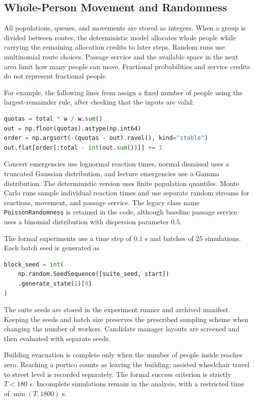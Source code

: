 \subsection{Whole-Person Movement and Randomness}

All populations, queues, and movements are stored as integers. When a group is divided between routes, the deterministic model allocates whole people while carrying the remaining allocation credits to later steps. Random runs use multinomial route choices. Passage service and the available space in the next area limit how many people can move. Fractional probabilities and service credits do not represent fractional people.

For example, the following lines from  assign a fixed number of people using the largest-remainder rule, after checking that the inputs are valid:
\begin{lstlisting}[language=Python,basicstyle=\ttfamily\small,breaklines=true,frame=single]
quotas = total * w / w.sum()
out = np.floor(quotas).astype(np.int64)
order = np.argsort(-(quotas - out).ravel(), kind="stable")
out.flat[order[:total - int(out.sum())]] += 1
\end{lstlisting}

Concert emergencies use lognormal reaction times, normal dismissal uses a truncated Gaussian distribution, and lecture emergencies use a Gamma distribution. The deterministic version uses finite population quantiles. Monte Carlo runs sample individual reaction times and use separate random streams for reactions, movement, and passage service. The legacy class name \texttt{PoissonRandomness} is retained in the code, although baseline passage service uses a binomial distribution with dispersion parameter $0.5$.

The formal experiments use a time step of $0.1$ s and batches of 25 simulations. Each batch seed is generated as
\begin{lstlisting}[language=Python,basicstyle=\ttfamily\small,breaklines=true,frame=single]
block_seed = int(
    np.random.SeedSequence([suite_seed, start])
    .generate_state(1)[0]
)
\end{lstlisting}
The suite seeds are stored in the experiment runner and archived manifest. Keeping the seeds and batch size preserves the prescribed sampling scheme when changing the number of workers. Candidate manager layouts are screened and then evaluated with separate seeds.

Building evacuation is complete only when the number of people inside reaches zero. Reaching a portico counts as leaving the building; assisted wheelchair travel to street level is recorded separately. The formal success criterion is strictly $T<180$ s. Incomplete simulations remain in the analysis, with a restricted time of $\min(T,1800)$ s.


